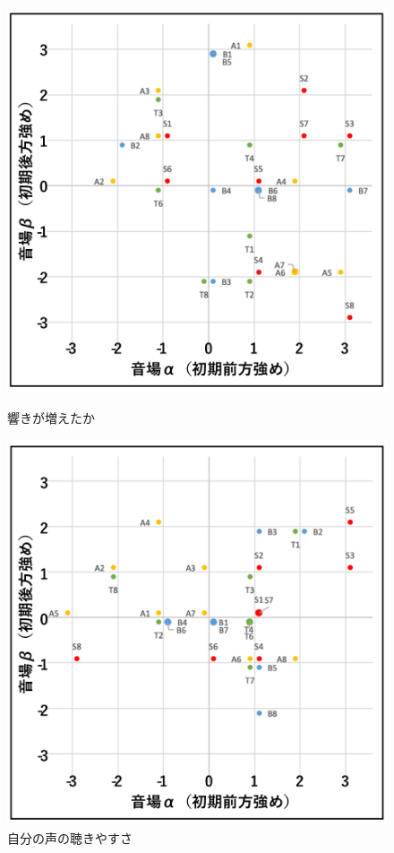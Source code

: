 \documentclass[11pt,a4j]{jreport}
\begin{document}
\begin{figure}[H]
  \begin{minipage}{0.5\linewidth}
    \centering
    \includegraphics[width=.9\linewidth]{images/subjectiveExp/scat_early_01reverb.pdf}
    \caption*{響きが増えたか}
  \end{minipage}%
  \begin{minipage}{0.5\linewidth}
    \centering
    \includegraphics[width=.9\linewidth]{images/subjectiveExp/scat_early_02selfVoice.pdf}
    \caption*{自分の声の聴きやすさ}
  \end{minipage}


\end{figure}
\end{document}
